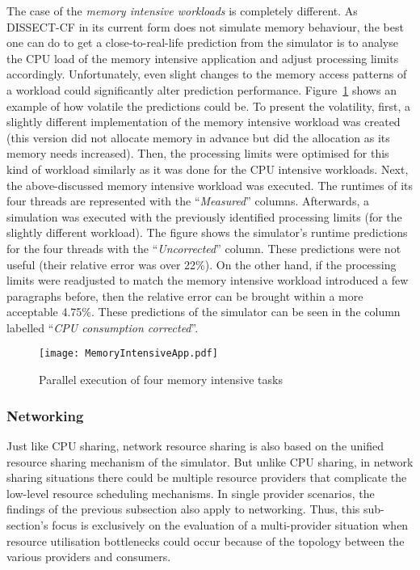 \documentclass[sort, compress, 5p]{elsarticle}
\begin{document}
The case of the \emph{memory intensive workloads} is completely different. As DISSECT-CF in its current form does not simulate memory behaviour, the best one can do to get a close-to-real-life prediction from the simulator is to analyse the CPU load of the memory intensive application and adjust processing limits accordingly. Unfortunately, even slight changes to the memory access patterns of a workload could significantly alter prediction performance. Figure~\ref{FIG-MemoryIntensive} shows an example of how volatile the predictions could be. To present the volatility, first, a slightly different implementation of the memory intensive workload was created (this version did not allocate memory in advance but did the allocation as its memory needs increased). Then, the processing limits were optimised for this kind of workload similarly as it was done for the CPU intensive workloads. Next, the above-discussed memory intensive workload was executed. The runtimes of its four threads are represented with the ``\emph{Measured}'' columns. Afterwards, a simulation was executed with the previously identified processing limits (for the slightly different workload). The figure shows the simulator's runtime predictions for the four threads with the ``\emph{Uncorrected}'' column. These predictions were not useful (their relative error was over 22\%). On the other hand, if the processing limits were readjusted to match the memory intensive workload introduced a few paragraphs before, then the relative error can be brought within a more acceptable 4.75\%. These predictions of the simulator can be seen in the column labelled ``\emph{CPU consumption corrected}''.

\begin{figure}[tb]
\center
\texttt{[image: MemoryIntensiveApp.pdf]}
\caption{Parallel execution of four memory intensive tasks\label{FIG-MemoryIntensive}}
\end{figure}

\subsubsection{Networking}

Just like CPU sharing, network resource sharing is also based on the unified resource sharing mechanism of the simulator. But unlike CPU sharing, in network sharing situations there could be multiple resource providers that complicate the low-level resource scheduling mechanisms. In single provider scenarios, the findings of the previous subsection also apply to networking. Thus, this sub-section's focus is exclusively on the evaluation of a multi-provider situation when resource utilisation bottlenecks could occur because of the topology between the various providers and consumers.
\end{document}
